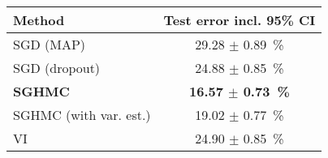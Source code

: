 \begin{tabular}{lc}
\toprule
                Method &     Test error incl. 95\% CI \\
\midrule
             SGD (MAP) &          29.28 $\pm$ 0.89~\% \\
         SGD (dropout) &          24.88 $\pm$ 0.85~\% \\
        \textbf{SGHMC} & \textbf{16.57 $\pm$ 0.73~\%} \\
SGHMC (with var. est.) &          19.02 $\pm$ 0.77~\% \\
                    VI &          24.90 $\pm$ 0.85~\% \\
\bottomrule
\end{tabular}
